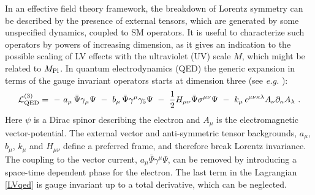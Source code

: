 \documentclass[12pt]{revtex4}
\begin{document}
In an effective field theory framework, the breakdown of Lorentz 
symmetry can be described by the presence of external tensors, which
are generated by some unspecified dynamics, coupled to SM operators. 
It is useful to characterize such operators by powers of increasing
dimension, as it gives an indication to the possible scaling of LV
effects with the ultraviolet (UV) scale $M$, which might be related to $M_{\rm Pl}$. In
quantum electrodynamics (QED) the generic expansion in terms of the
gauge invariant operators starts at dimension three (see {\em e.g.} 
\cite{Kost1}): 
%
\begin{equation}
{\cal L}_{\rm QED}^{(3)} =
~-~a_\mu\,  \bar \Psi \gamma_\mu \Psi
~-~ b_\mu\,  \bar \Psi \gamma^\mu \gamma_5 \Psi 
~-~ \frac{1}{2}H_{\mu\nu}\bar \Psi \sigma^{\mu\nu} \Psi
~-~ k_\mu\,  
\epsilon^{\mu\nu\kappa\lambda} A_\nu \partial_\kappa A_\lambda~.
\label{LVqed}
\end{equation}
%
Here $\psi$ is a Dirac spinor describing the electron and $A_\mu$ is the
electromagnetic vector-potential. The external vector and
anti-symmetric tensor backgrounds, $a_{\mu}$, $b_\mu$, $k_\mu$ and
$H_{\mu\nu}$ define a preferred frame, and therefore break Lorentz
invariance. The coupling to the vector current, 
$a_\mu \bar \Psi \gamma^\mu \Psi$, can be removed by introducing a
space-time dependent phase for the electron. The last term in the
Lagrangian \eqref{LVqed} is gauge invariant up to a total derivative,
which can be neglected. 
\end{document}
